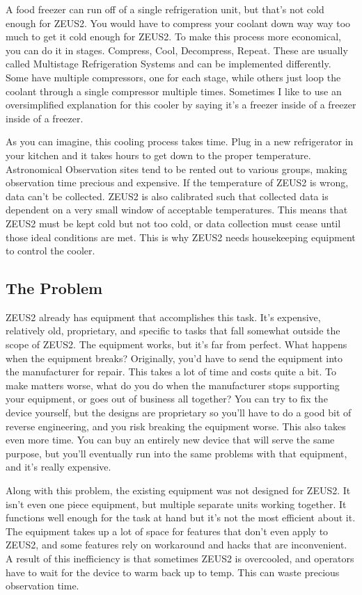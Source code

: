\documentclass[prb,preprint]{revtex4-1}
\begin{document}
A food freezer can run off of a single refrigeration unit, but that's not cold enough for ZEUS2. You would have to compress your coolant down way way too much to get it cold enough for ZEUS2. To make this process more economical, you can do it in stages. Compress, Cool, Decompress, Repeat. These are usually called Multistage Refrigeration Systems and can be implemented differently. Some have multiple compressors, one for each stage, while others just loop the coolant through a single compressor multiple times. Sometimes I like to use an oversimplified explanation for this cooler by saying it's a freezer inside of a freezer inside of a freezer.

As you can imagine, this cooling process takes time. Plug in a new refrigerator in your kitchen and it takes hours to get down to the proper temperature. Astronomical Observation sites tend to be rented out to various groups, making observation time precious and expensive. If the temperature of ZEUS2 is wrong, data can't be collected. ZEUS2 is also calibrated such that collected data is dependent on a very small window of acceptable temperatures. This means that ZEUS2 must be kept cold but not too cold, or data collection must cease until those ideal conditions are met. This is why ZEUS2 needs housekeeping equipment to control the cooler. 

\subsection{The Problem}
ZEUS2 already has equipment that accomplishes this task. It's expensive, relatively old, proprietary, and specific to tasks that fall somewhat outside the scope of ZEUS2. The equipment works, but it's far from perfect. What happens when the equipment breaks? Originally, you'd have to send the equipment into the manufacturer for repair. This takes a lot of time and costs quite a bit. To make matters worse, what do you do when the manufacturer stops supporting your equipment, or goes out of business all together? You can try to fix the device yourself, but the designs are proprietary so you'll have to do a good bit of reverse engineering, and you risk breaking the equipment worse. This also takes even more time. You can buy an entirely new device that will serve the same purpose, but you'll eventually run into the same problems with that equipment, and it's really expensive.

Along with this problem, the existing equipment was not designed for ZEUS2. It isn't even one piece equipment, but multiple separate units working together. It functions well enough for the task at hand but it's not the most efficient about it. The equipment takes up a lot of space for features that don't even apply to ZEUS2, and some features rely on workaround and hacks that are inconvenient. A result of this inefficiency is that sometimes ZEUS2 is overcooled, and operators have to wait for the device to warm back up to temp. This can waste precious observation time. 
\end{document}
